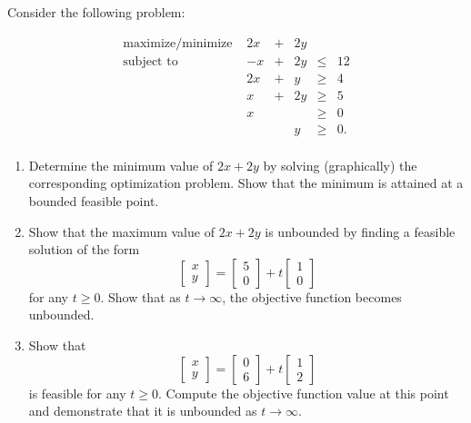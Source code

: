  \begin{ex}{}{} 
Consider the following problem:

\[
\begin{array}{rrcllll}
\mbox{maximize/minimize } & 2x & + & 2y \\
\mbox{subject to} & -x & + & 2y & \leq & 12 \\
& 2x & + & y & \geq & 4 \\
& x & + & 2y & \geq & 5 \\
& x & & & \geq & 0 \\
& & & y & \geq & 0. \\
\end{array}
\]

\begin{enumerate}

\item Determine the minimum value of \(2x + 2y\) by solving (graphically) the corresponding optimization problem. Show that the minimum is attained at a bounded feasible point.


\item Show that the maximum value of \(2x + 2y\) is unbounded by finding a feasible solution of the form
\[
\begin{bmatrix} x \\ y \end{bmatrix} = \begin{bmatrix} 5\\ 0\end{bmatrix} + t \begin{bmatrix} 1\\ 0\end{bmatrix}
\]
for any \(t \geq 0\). Show that as \(t \to \infty\), the objective function becomes unbounded.

\item Show that 
\[
\begin{bmatrix} x \\ y \end{bmatrix} = \begin{bmatrix} 0 \\ 6 \end{bmatrix} + t\begin{bmatrix} 1 \\ 2 \end{bmatrix}
\]
is feasible for any \(t \geq 0\). Compute the objective function value at this point and demonstrate that it is unbounded as \(t \to \infty\).


\end{enumerate}

\end{ex}

